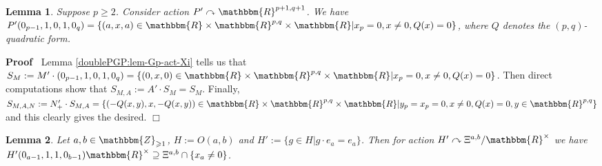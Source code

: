 \documentclass{article}
\newcommand{\assign}{:=}
\newenvironment{proof}{\noindent\textbf{Proof\ }}{\hspace*{\fill}$\Box$\medskip}
\numberwithin{definition}{section}
\newtheorem{lemma}{Lemma}
\numberwithin{lemma}{section}
\numberwithin{proposition}{section}
{\theorembodyfont{\rmfamily}\newtheorem{remark}{Remark}
\numberwithin{remark}{section}
}
\begin{document}
\begin{lemma}
  \label{doublePGP:lem-ee}Suppose $p \geqslant 2$. Consider action $P'
  \curvearrowright \mathbbm{R}^{p + 1, q + 1}$. We have $P' ( 0_{p - 1}, 1, 0,
  1, 0_q) = \{ ( a, x, a) \in \mathbbm{R} \times \mathbbm{R}^{p, q} \times
  \mathbbm{R} | x_p = 0, x \neq 0, Q ( x) = 0 \}$, where $Q$ denotes the $( p,
  q)$-quadratic form.
\end{lemma}

\begin{proof}
  Lemma \ref{doublePGP:lem-Gp-act-Xi} tells us that $S_M \assign M' \cdot (
  0_{p - 1}, 1, 0, 1, 0_q) = \{ ( 0, x, 0) \in \mathbbm{R} \times
  \mathbbm{R}^{p, q} \times \mathbbm{R} | x_p = 0, x \neq 0, Q ( x) = 0 \}$.
  Then direct computations show that $S_{M, A} \assign A' \cdot S_M = S_M$.
  Finally, $S_{M, A, N} \assign N_+' \cdot S_{M, A} = \{ ( - Q ( x, y), x, - Q
  ( x, y)) \in \mathbbm{R} \times \mathbbm{R}^{p, q} \times \mathbbm{R} | y_p
  = x_p = 0, x \neq 0, Q ( x) = 0, y \in \mathbbm{R}^{p, q}_{} \}$ and this
  clearly gives the desired.
\end{proof}

\begin{lemma}
  \label{doublePGP:lem-en-aux}Let $a, b \in \mathbbm{Z}_{\geqslant 1}$, $H
  \assign O ( a, b)$ and $H' \assign \{g \in H|g \cdot e_a = e_a \}$. Then for
  action $H' \curvearrowright \Xi^{a, b} /\mathbbm{R}^{\times}$ we have $H' (
  0_{a - 1}, 1, 1, 0_{b - 1}) \mathbbm{R}^{\times} \supseteq \Xi^{a, b} \cap
  \{ x_a \neq 0 \}$.
\end{lemma}
\end{document}
